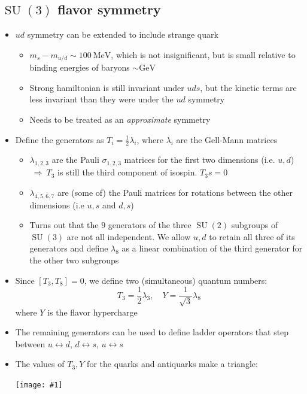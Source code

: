 \documentclass[11pt]{article}
\DeclareMathOperator{\SU}{SU}
\newcommand{\gev}{\text{GeV}}
\newcommand{\mev}{\text{MeV}}
\newcommand{\thus}{\ensuremath{~\Rightarrow~}}
\newcommand{\embedimgw}[2]{\begin{center}\texttt{[image: \#1]}\end{center}}
\begin{document}
\subsection{$\SU(3)$ flavor symmetry}
\begin{itemize}
  \item $ud$ symmetry can be extended to include strange quark
  \begin{itemize}
    \item $m_s - m_{u/d}\sim100~\mev$, which is not insignificant, but is small relative to binding energies of baryons $\sim\gev$
    \item Strong hamiltonian is still invariant under $uds$, but the kinetic terms are less invariant than they were under the $ud$ symmetry
    \item Needs to be treated as an \emph{approximate} symmetry
  \end{itemize}
  \item Define the generators as $T_i = \frac{1}{2}\lambda_i$, where $\lambda_i$ are the Gell-Mann matrices
  \begin{itemize}
    \item $\lambda_{1,2,3}$ are the Pauli $\sigma_{1,2,3}$ matrices for the first two dimensions (i.e. $u,d$) \thus $T_3$ is still the third component of isospin. $T_3s = 0$
    \item $\lambda_{4,5,6,7}$ are (some of) the Pauli matrices for rotations between the other dimensions (i.e $u,s$ and $d,s$)
    \item Turns out that the $9$ generators of the three $\SU(2)$ subgroups of $\SU(3)$ are not all independent. We allow $u,d$ to retain all three of its generators and define $\lambda_8$ as a linear combination of the third generator for the other two subgroups
  \end{itemize}
  \item Since $[T_3,T_8]=0$, we define two (simultaneous) quantum numbers:
  \begin{equation}
    T_3 = \frac{1}{2}\lambda_3,\quad Y = \frac{1}{\sqrt3}\lambda_8
  \end{equation}
  where $Y$ is the flavor hypercharge
  \item The remaining generators can be used to define ladder operators that step between $u\leftrightarrow d$, $d\leftrightarrow s$, $u\leftrightarrow s$
  \item The values of $T_3,Y$ for the quarks and antiquarks make a triangle:
  \embedimgw{figs/su3_t3y.png}{.6}
\end{itemize}
\end{document}

